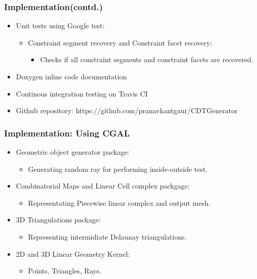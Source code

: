 \documentclass{beamer}
\begin{document}
	\begin{frame}
		\frametitle{Implementation(contd.)}
			\begin{itemize}
				\item Unit tests using Google test:
					\begin{itemize}
						\item Constraint segment recovery and Constraint facet recovery:
							\begin{itemize}
								\item Checks if all constraint segments and constraint facets are recovered.
							\end{itemize}	
					\end{itemize}		
				\item Doxygen inline code documentation
				\item Continous integration testing on Travis CI	
				\item Github repository: https://github.com/pranavkantgaur/CDTGenerator
			\end{itemize}
	\end{frame}	
	\begin{frame}
		\frametitle{Implementation: Using CGAL}
			\begin{itemize}
				\item Geometric object generator package:
					\begin{itemize}
						\item Generating random ray for performing inside-outside test.	
					\end{itemize}
				\item Combinatorial Maps and Linear Cell complex packgage:
					\begin{itemize}
						\item Representating Piecewise linear complex and output mesh.	
					\end{itemize}
				\item 3D Triangulations package:
					\begin{itemize}
						\item Representing intermidiate Delaunay triangulations.	
					\end{itemize}		
				\item 2D and 3D Linear Geometry Kernel:
					\begin{itemize}
						\item Points, Triangles, Rays.	
					\end{itemize}		
			\end{itemize}		
	\end{frame}	
\end{document}
